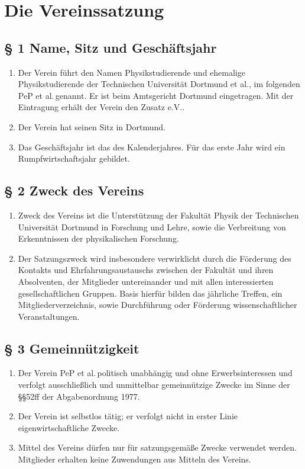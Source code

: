 \documentclass[fontsize=12pt, paper=a4, DIV14, parskip]{scrreprt}
\begin{document}
\section{Die Vereinssatzung}

\subsection{\S{} 1 Name, Sitz und Geschäftsjahr}

\begin{enumerate}[\qquad(1)]
	\item Der Verein führt den Namen \glqq Physikstudierende und ehemalige Physikstudierende der Technischen Universität Dortmund et al.\grqq, im folgenden \glqq PeP et al.\grqq$\,$genannt. Er ist beim Amtsgericht Dortmund eingetragen. Mit der Eintragung erhält der Verein den Zusatz \glqq e.V.\grqq.
	\item Der Verein hat seinen Sitz in Dortmund.
	\item Das Geschäftsjahr ist das des Kalenderjahres. Für das erste Jahr wird ein Rumpfwirtschaftsjahr gebildet.
\end{enumerate}

\subsection{\S{} 2 Zweck des Vereins}

\begin{enumerate}[\qquad(1)]
	\item Zweck des Vereins ist die Unterstützung der Fakultät Physik der Technischen Universität Dortmund in Forschung und Lehre, sowie die Verbreitung von Erkenntnissen der physikalischen Forschung.
	\item Der Satzungszweck wird insbesondere verwirklicht durch die Förderung des Kontakts und Ehrfahrungsaustauschs zwischen der Fakultät und ihren Absolventen, der Mitglieder untereinander und mit allen interessierten gesellschaftlichen Gruppen. Basis hierfür bilden das jährliche Treffen, ein Mitgliederverzeichnis, sowie Durchführung oder Förderung wissenschaftlicher Veranstaltungen.
\end{enumerate}

\subsection{\S{} 3 Gemeinnützigkeit}

\begin{enumerate}[\qquad(1)]
	\item Der Verein \glqq PeP et al.\grqq$\,$politisch unabhängig und ohne Erwerbsinteressen und verfolgt ausschließlich und unmittelbar gemeinnützige Zwecke im Sinne der §§52ff der Abgabenordnung 1977.
	\item Der Verein ist selbstlos tätig; er verfolgt nicht in erster Linie eigenwirtschaftliche Zwecke.
	\item Mittel des Vereins dürfen nur für satzungsgemäße Zwecke verwendet werden. Mitglieder erhalten keine Zuwendungen aus Mitteln des Vereins.
\end{enumerate}
\end{document}
